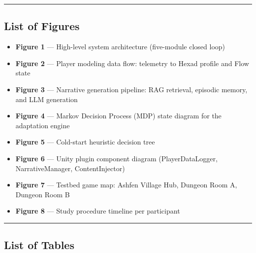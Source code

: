 \begin{center}\rule{0.5\linewidth}{0.5pt}\end{center}

\subsection{List of Figures}\label{list-of-figures}

\begin{itemize}
\tightlist
\item
  \textbf{Figure 1} --- High-level system architecture (five-module
  closed loop)
\item
  \textbf{Figure 2} --- Player modeling data flow: telemetry to Hexad
  profile and Flow state
\item
  \textbf{Figure 3} --- Narrative generation pipeline: RAG retrieval,
  episodic memory, and LLM generation
\item
  \textbf{Figure 4} --- Markov Decision Process (MDP) state diagram for
  the adaptation engine
\item
  \textbf{Figure 5} --- Cold-start heuristic decision tree
\item
  \textbf{Figure 6} --- Unity plugin component diagram
  (PlayerDataLogger, NarrativeManager, ContentInjector)
\item
  \textbf{Figure 7} --- Testbed game map: Ashfen Village Hub, Dungeon
  Room A, Dungeon Room B
\item
  \textbf{Figure 8} --- Study procedure timeline per participant
\end{itemize}

\begin{center}\rule{0.5\linewidth}{0.5pt}\end{center}

\subsection{List of Tables}\label{list-of-tables}

